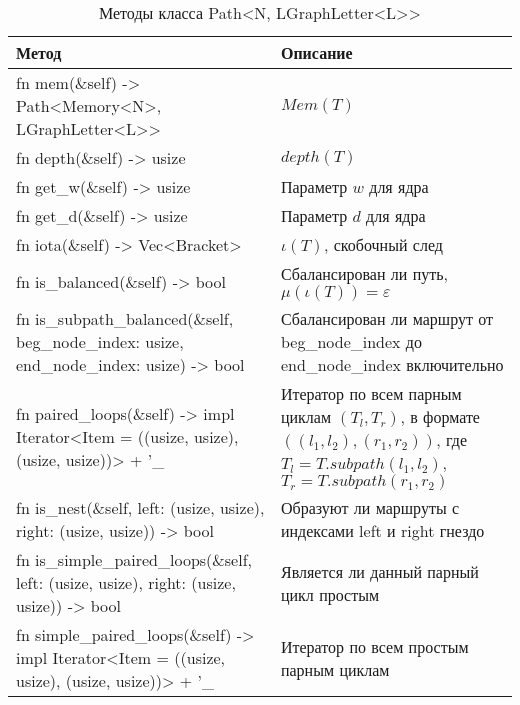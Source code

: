 \begin{table}
    \caption{Методы класса Path<N, LGraphLetter<L>{}>}
    \label{class_PathNLGraphLetterL_api}
    \begin{tabular}{|m{20em}|m{20em}|}
        \hline
        \textbf{Метод} & \textbf{Описание}\\
        \hline
            fn mem(\&self) -> Path<Memory<N>, LGraphLetter<L>{}> & $Mem(T)$ \\
        \hline
            fn depth(\&self) -> usize & $depth(T)$ \\
        \hline
            fn get\_w(\&self) -> usize & Параметр $w$ для ядра \\
        \hline
            fn get\_d(\&self) -> usize & Параметр $d$ для ядра \\
        \hline
            fn iota(\&self) -> Vec<Bracket> & $\iota(T)$, скобочный след \\
        \hline
            fn is\_balanced(\&self) -> bool & Сбалансирован ли путь, $\mu(\iota(T)) = \varepsilon$ \\
        \hline
            fn is\_subpath\_balanced(\&self, beg\_node\_index: usize, end\_node\_index: usize) -> bool & Сбалансирован ли маршрут от beg\_node\_index до end\_node\_index включительно \\
        \hline
            fn paired\_loops(\&self) -> impl Iterator<Item = ((usize, usize), (usize, usize))> + '\_ & Итератор по всем парным циклам $(T_l, T_r)$, в формате $((l_1,l_2), (r_1, r_2))$, где $T_l = T.subpath(l_1, l_2)$, $T_r = T.subpath(r_1, r_2)$ \\
        \hline
            fn is\_nest(\&self, left: (usize, usize), right: (usize, usize)) -> bool & Образуют ли маршруты с индексами left и right гнездо\\
        \hline
            fn is\_simple\_paired\_loops(\&self, left: (usize, usize), right: (usize, usize)) -> bool & Является ли данный парный цикл простым \\
        \hline
            fn simple\_paired\_loops(\&self) -> impl Iterator<Item = ((usize, usize), (usize, usize))> + '\_ & Итератор по всем простым парным циклам \\
        \hline
    \end{tabular}
\end{table}

